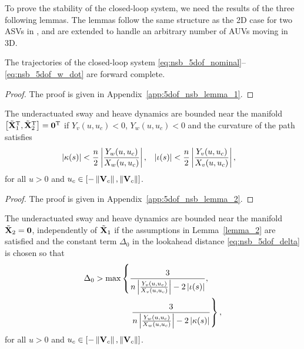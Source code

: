 To prove the stability of the closed-loop system, we need the results of the three following lemmas.
The lemmas follow the same structure as the 2D case for two ASVs in \cite{eek_formation_2021}, and are extended to handle an arbitrary number of AUVs moving in 3D.
\begin{lemma}
    \label{lemma_1}
    The trajectories of the closed-loop system \eqref{eq:nsb_5dof_nominal}--\eqref{eq:nsb_5dof_w_dot} are forward complete.
\end{lemma}

\begin{proof}
    The proof is given in Appendix~\ref{app:5dof_nsb_lemma_1}.
\end{proof}

\begin{lemma}
    \label{lemma_2}
    The underactuated sway and heave dynamics are bounded near the manifold $\left[\tilde{\mathbf{X}}_1^{\mathrm{T}}, \tilde{\mathbf{X}}_2^{\mathrm{T}}\right] = \mathbf{0}^{\mathrm{T}}$ if $Y_v(u, u_c) < 0$, $Y_w(u, u_c) < 0$ and the curvature of the path satisfies
    \begin{align}
        \left|\kappa(s)\right| &< \frac{n}{2}\left|\frac{Y_w(u, u_c)}{X_w(u, u_c)}\right|, &
        \left|\iota(s)\right| &< \frac{n}{2}\left|\frac{Y_v(u, u_c)}{X_v(u, u_c)}\right|, \label{eq:nsb_5dof_curvature_limit}
    \end{align}
    for all $u > 0$ and $u_c \in [-\left\|\mathbf{V}_c\right\|, \left\|\mathbf{V}_c\right\|]$.
\end{lemma}

\begin{proof}
    The proof is given in Appendix~\ref{app:5dof_nsb_lemma_2}.
\end{proof}

\begin{lemma}
    \label{lemma_3}
    The underactuated sway and heave dynamics are bounded near the manifold $\tilde{\mathbf{X}}_2 = \mathbf{0}$, independently of $\tilde{\mathbf{X}}_1$ if the assumptions in Lemma~\ref{lemma_2} are satisfied and the constant term $\Delta_0$ in the lookahead distance \eqref{eq:nsb_5dof_delta} is chosen so that
    \begin{equation}
        \begin{split}
            \Delta_0 > \max&\left\{\frac{3}{n\left|\frac{Y_v\left(u, u_c\right)}{X_v\left(u, u_c\right)}\right| - 2\left|\iota(s)\right|}, \right. \\
            & \quad \left. \frac{3}{n\left|\frac{Y_w\left(u, u_c\right)}{X_w\left(u, u_c\right)}\right| - 2\left|\kappa(s)\right|}\right\},
        \end{split} \label{eq:nsb_5dof_lookahead_limit}
    \end{equation}
    for all $u > 0$ and $u_c \in [-\left\|\mathbf{V}_c\right\|, \left\|\mathbf{V}_c\right\|]$.
\end{lemma}


